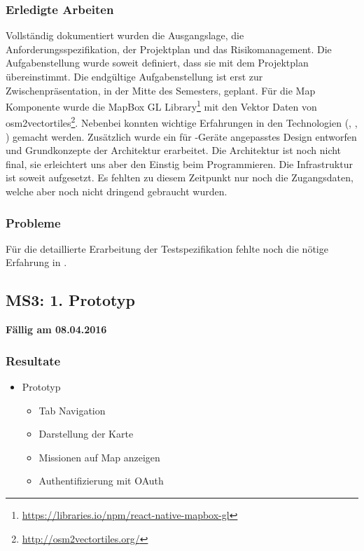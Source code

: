 \subsubsection{Erledigte Arbeiten}
Vollständig dokumentiert wurden die Ausgangslage, die Anforderungsspezifikation, der Projektplan und das Risikomanagement.
Die Aufgabenstellung wurde soweit definiert, dass sie mit dem Projektplan übereinstimmt.
Die endgültige Aufgabenstellung ist erst zur Zwischenpräsentation, in der Mitte des Semesters, geplant.
Für die Map Komponente wurde die MapBox GL Library\footnote{\url{https://libraries.io/npm/react-native-mapbox-gl}} mit den Vektor Daten von osm2vectortiles\footnote{\url{http://osm2vectortiles.org/}}.
Nebenbei konnten wichtige Erfahrungen in den Technologien (, , ) gemacht werden.
Zusätzlich wurde ein für -Geräte angepasstes Design entworfen und Grundkonzepte der Architektur erarbeitet.
Die Architektur ist noch nicht final, sie erleichtert uns aber den Einstig beim Programmieren.
Die Infrastruktur ist soweit aufgesetzt.
Es fehlten zu diesem Zeitpunkt nur noch die Zugangsdaten, welche aber noch nicht dringend gebraucht wurden.

\subsubsection{Probleme}
Für die detaillierte Erarbeitung der Testspezifikation fehlte noch die nötige Erfahrung in .


\subsection{MS3: 1. Prototyp}
\label{pm-ms3}
\textbf{Fällig am 08.04.2016}
\subsubsection{Resultate}
\begin{itemize}
	\item {} Prototyp
	\begin{itemize}
		\item Tab Navigation
		\item Darstellung der Karte
		\item Missionen auf Map anzeigen
		\item Authentifizierung mit OAuth
	\end{itemize}
\end{itemize}

